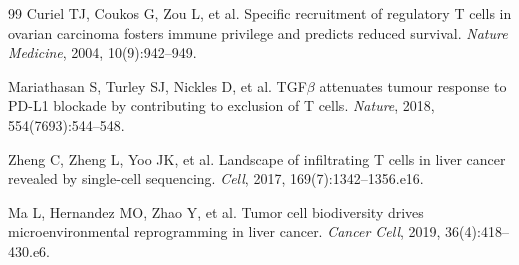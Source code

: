 \documentclass[12pt, a4paper]{ctexart}
\begin{document}
\begin{thebibliography}{99}
Curiel TJ, Coukos G, Zou L, et al.
Specific recruitment of regulatory T cells in ovarian carcinoma fosters immune privilege and predicts reduced survival.
\textit{Nature Medicine}, 2004, 10(9):942--949.

Mariathasan S, Turley SJ, Nickles D, et al.
TGF$\beta$ attenuates tumour response to PD-L1 blockade by contributing to exclusion of T cells.
\textit{Nature}, 2018, 554(7693):544--548.

Zheng C, Zheng L, Yoo JK, et al.
Landscape of infiltrating T cells in liver cancer revealed by single-cell sequencing.
\textit{Cell}, 2017, 169(7):1342--1356.e16.

Ma L, Hernandez MO, Zhao Y, et al.
Tumor cell biodiversity drives microenvironmental reprogramming in liver cancer.
\textit{Cancer Cell}, 2019, 36(4):418--430.e6.

\end{thebibliography}
\end{document}
